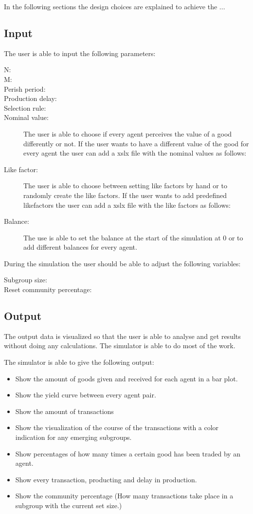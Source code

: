 \documentclass[twoside,openright]{uva-bachelor-thesis}
\begin{document}
In the following sections the design choices are explained to achieve the ...
\subsection{Input}
The user is able to input the following parameters:

\begin{description}
  \item[N:] 
  \item[M:] 
  \item[Perish period:] 
  \item[Production delay:]
 \item[Selection rule:] 
  \item[Nominal value:] The user is able to choose if every agent perceives the value of a good differently or not. If the user wants to have a different value of the good for every agent the user can add a xslx file with the nominal values as follows:
  \item[Like factor:] The user is able to choose between setting like factors by hand or to randomly create the like factors. If the user wants to add predefined likefactors the user can add a xslx file with the like factors as follows:
 \item[Balance:] The use is able to set the balance at the start of the simulation at 0 or to add different balances for every agent.
\end{description}
During the simulation the user should be able to adjust the following variables:

\begin{description}
  \item[Subgroup size:] 
  \item[Reset community percentage:] 

\end{description}
\subsection{Output}
The output data is visualized so that the user is able to analyse and get results without doing any calculations. The simulator is able to do most of the work.

The simulator is able to give the following output:
\begin{itemize}
  \item Show the amount of goods given and received for each agent in a bar plot.
  \item Show the yield curve between every agent pair.
  \item Show the amount of transactions
  \item Show the visualization of the course of the transactions with a color indication for any emerging subgroups.
  \item Show percentages of how many times a certain good has been traded by an agent.
  \item Show every transaction, producting and delay in production.
  \item Show the community percentage (How many transactions take place in a subgroup with the current set size.)
\end{itemize}
\end{document}
